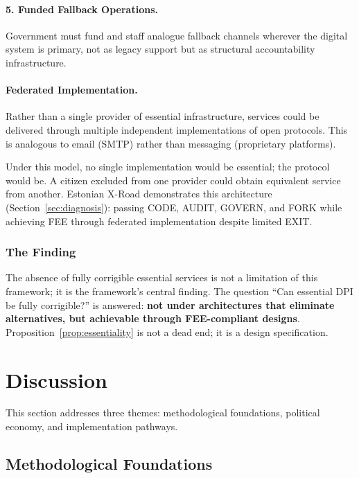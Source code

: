 \documentclass{article}
\begin{document}
\paragraph{5. Funded Fallback Operations.} Government must fund and staff analogue fallback channels wherever the digital system is primary, not as legacy support but as structural accountability infrastructure.

\paragraph{Federated Implementation.} Rather than a single provider of essential infrastructure, services could be delivered through multiple independent implementations of open protocols. This is analogous to email (SMTP) rather than messaging (proprietary platforms).

Under this model, no single implementation would be essential; the protocol would be. A citizen excluded from one provider could obtain equivalent service from another. Estonian X-Road demonstrates this architecture (Section~\ref{sec:diagnosis}): passing CODE, AUDIT, GOVERN, and FORK while achieving FEE through federated implementation despite limited EXIT.

\subsubsection{The Finding}

The absence of fully corrigible essential services is not a limitation of this framework; it is the framework's central finding. The question ``Can essential DPI be fully corrigible?'' is answered: \textbf{not under architectures that eliminate alternatives, but achievable through FEE-compliant designs}. Proposition~\ref{prop:essentiality} is not a dead end; it is a design specification.

\section{Discussion}
\label{sec:discussion}

This section addresses three themes: methodological foundations, political economy, and implementation pathways.

\subsection{Methodological Foundations}
\label{subsec:methodology}
\end{document}
